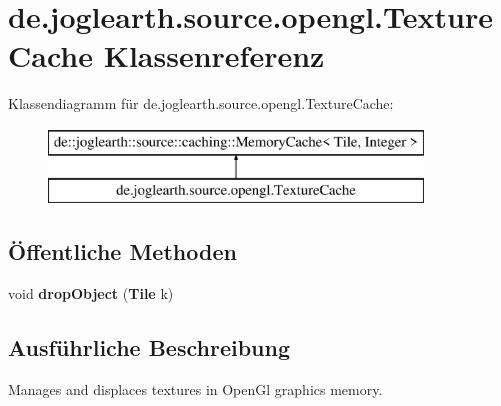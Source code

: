 \section{de.\-joglearth.\-source.\-opengl.\-Texture\-Cache Klassenreferenz}
\label{classde_1_1joglearth_1_1source_1_1opengl_1_1_texture_cache}
Klassendiagramm für de.\-joglearth.\-source.\-opengl.\-Texture\-Cache\-:\begin{figure}[H]
\begin{center}
\leavevmode
\includegraphics[height=2.000000cm]{classde_1_1joglearth_1_1source_1_1opengl_1_1_texture_cache}
\end{center}
\end{figure}
\subsection*{Öffentliche Methoden}
\begin{DoxyCompactItemize}
\item 
void {\bfseries drop\-Object} ({\bf Tile} k)\label{classde_1_1joglearth_1_1source_1_1opengl_1_1_texture_cache_af78af343a17ade633613f278d1e16c26}

\end{DoxyCompactItemize}


\subsection{Ausführliche Beschreibung}
Manages and displaces textures in Open\-Gl graphics memory. 